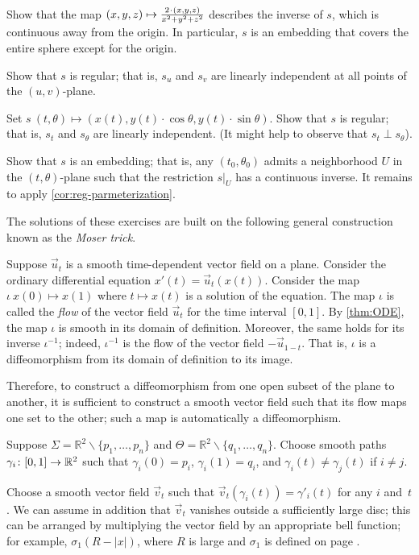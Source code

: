 \begin{multicols}{2}
Show that the map 
$(x,y,z)\z\mapsto \tfrac{2\cdot(x,y,z)}{x^2+y^2+z^2}$
describes the inverse of $s$, which is continuous away from the origin.
In particular, $s$ is an embedding that covers the entire sphere except for the origin.

Show that $s$ is regular; that is, $s_u$ and $s_v$ are linearly independent at all points of the $(u,v)$-plane.

Set
$s\:(t,\theta)\mapsto (x(t), y(t)\cdot\cos\theta,y(t)\cdot\sin\theta)$.
Show that $s$ is regular; that is, $s_t$ and $s_\theta$ are linearly independent.
(It might help to observe that $s_t\perp s_\theta$).

Show that $s$ is an embedding;
that is, any $(t_0,\theta_0)$ admits a neighborhood $U$ in the $(t,\theta)$-plane such that the restriction $s|_U$ has a continuous inverse.
It remains to apply \ref{cor:reg-parmeterization}.

The solutions of these exercises are built on the following general construction known as the \emph{Moser trick}.

Suppose $\vec u_t$ is a smooth time-dependent vector field on a plane.
Consider the ordinary differential equation $x'(t)=\vec u_t(x(t))$.
Consider the map $\iota\:x(0)\mapsto x(1)$ where $t\mapsto x(t)$ is a solution of the equation.
The map $\iota$ is called the \emph{flow} of the vector field $\vec u_t$ for the time interval $[0,1]$.
By \ref{thm:ODE}, the map $\iota$ is smooth in its domain of definition.
Moreover, the same holds for its inverse $\iota^{-1}$;
indeed, $\iota^{-1}$ is the flow of the vector field $-\vec u_{1-t}$.
That is, $\iota$ is a diffeomorphism from its domain of definition to its image. 


Therefore, to construct a diffeomorphism from one open subset of the plane to another, it is sufficient to construct a smooth vector field such that its flow maps one set to the other;
such a map is automatically a diffeomorphism.


Suppose $\Sigma=\mathbb{R}^2\backslash\{p_1,\dots,p_n\}$ and $\Theta=\mathbb{R}^2\backslash\{q_1,\dots,q_n\}$.
Choose smooth paths $\gamma_i\:[0,1]\z\to \mathbb{R}^2$ such that $\gamma_i(0)=p_i$,
$\gamma_i(1)=q_i$, and $\gamma_i(t)\ne \gamma_j(t)$ if $i\ne j$.

Choose a smooth vector field $\vec v_t$ such that $\vec v_t(\gamma_i(t))=\gamma'_i(t)$ for any $i$ and~$t$.
We can assume in addition that $\vec v_t$ vanishes outside a sufficiently large disc; this can be arranged by multiplying the vector field by an appropriate bell function;
for example, $\sigma_1(R-|x|)$, where $R$ is large and $\sigma_1$ is defined on page \pageref{page:sigma-function}.


\end{multicols}

